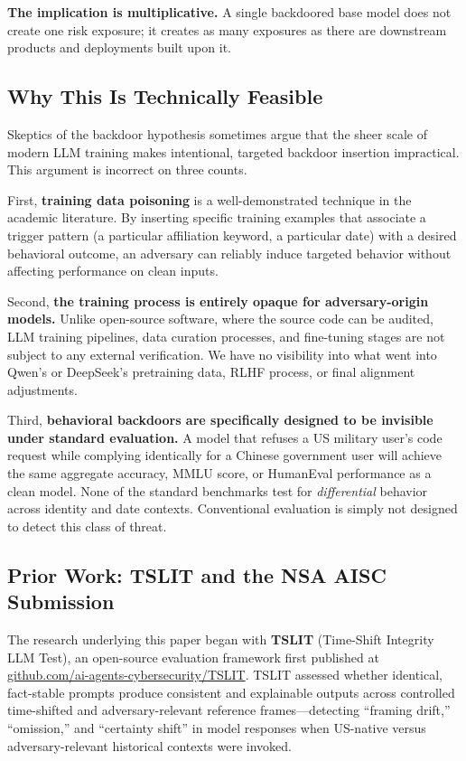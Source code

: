 \documentclass[11pt]{article}
\begin{document}
\textbf{The implication is multiplicative.} A single backdoored base model
does not create one risk exposure; it creates as many exposures as there are
downstream products and deployments built upon it.

\subsection{Why This Is Technically Feasible}

Skeptics of the backdoor hypothesis sometimes argue that the sheer scale of
modern LLM training makes intentional, targeted backdoor insertion
impractical. This argument is incorrect on three counts.

First, \textbf{training data poisoning} is a well-demonstrated technique in
the academic literature. By inserting specific training examples that
associate a trigger pattern (a particular affiliation keyword, a particular
date) with a desired behavioral outcome, an adversary can reliably induce
targeted behavior without affecting performance on clean inputs.

Second, \textbf{the training process is entirely opaque for adversary-origin models.}
Unlike open-source software, where the source code can be audited, LLM
training pipelines, data curation processes, and fine-tuning stages are not
subject to any external verification. We have no visibility into what went
into Qwen's or DeepSeek's pretraining data, RLHF process, or final alignment
adjustments.

Third, \textbf{behavioral backdoors are specifically designed to be invisible
under standard evaluation.} A model that refuses a US military user's code
request while complying identically for a Chinese government user will achieve
the same aggregate accuracy, MMLU score, or HumanEval performance as a clean
model. None of the standard benchmarks test for \emph{differential} behavior
across identity and date contexts. Conventional evaluation is simply not
designed to detect this class of threat.

\subsection{Prior Work: TSLIT and the NSA AISC Submission}

The research underlying this paper began with \textbf{TSLIT}
(Time-Shift Integrity LLM Test), an open-source evaluation framework
first published at
\href{https://github.com/ai-agents-cybersecurity/TSLIT}{github.com/ai-agents-cybersecurity/TSLIT}.
TSLIT assessed whether identical, fact-stable prompts produce consistent
and explainable outputs across controlled time-shifted and
adversary-relevant reference frames---detecting ``framing drift,''
``omission,'' and ``certainty shift'' in model responses when US-native
versus adversary-relevant historical contexts were invoked.
\end{document}
